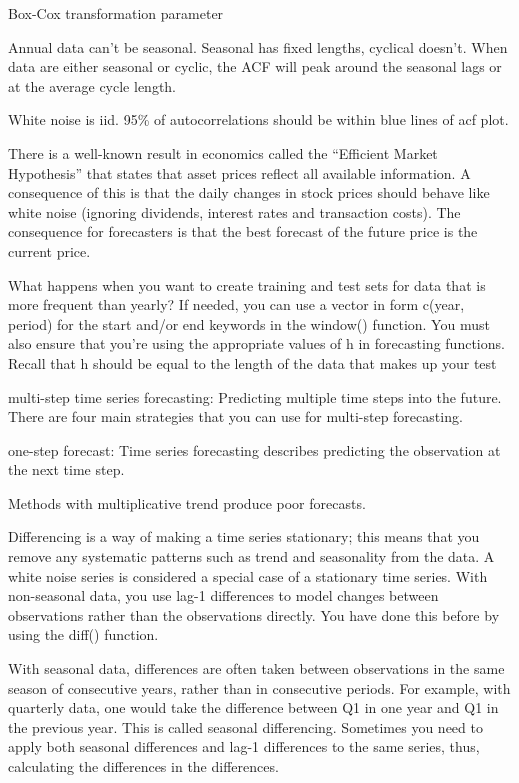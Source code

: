 \documentclass[]{book}
\begin{document}
Box-Cox transformation parameter

Annual data can't be seasonal. Seasonal has fixed lengths, cyclical doesn't. When data are either seasonal or cyclic, the ACF will peak around the seasonal lags or at the average cycle length.

White noise is iid. 95\% of autocorrelations should be within blue lines of acf plot.

There is a well-known result in economics called the ``Efficient Market Hypothesis'' that states that asset prices reflect all available information. A consequence of this is that the daily changes in stock prices should behave like white noise (ignoring dividends, interest rates and transaction costs). The consequence for forecasters is that the best forecast of the future price is the current price.

What happens when you want to create training and test sets for data that is more frequent than yearly? If needed, you can use a vector in form c(year, period) for the start and/or end keywords in the window() function. You must also ensure that you're using the appropriate values of h in forecasting functions. Recall that h should be equal to the length of the data that makes up your test

multi-step time series forecasting: Predicting multiple time steps into the future. There are four main strategies that you can use for multi-step forecasting.

one-step forecast: Time series forecasting describes predicting the observation at the next time step.

Methods with multiplicative trend produce poor forecasts.

Differencing is a way of making a time series stationary; this means that you remove any systematic patterns such as trend and seasonality from the data. A white noise series is considered a special case of a stationary time series. With non-seasonal data, you use lag-1 differences to model changes between observations rather than the observations directly. You have done this before by using the diff() function.

With seasonal data, differences are often taken between observations in the same season of consecutive years, rather than in consecutive periods. For example, with quarterly data, one would take the difference between Q1 in one year and Q1 in the previous year. This is called seasonal differencing. Sometimes you need to apply both seasonal differences and lag-1 differences to the same series, thus, calculating the differences in the differences.
\end{document}
